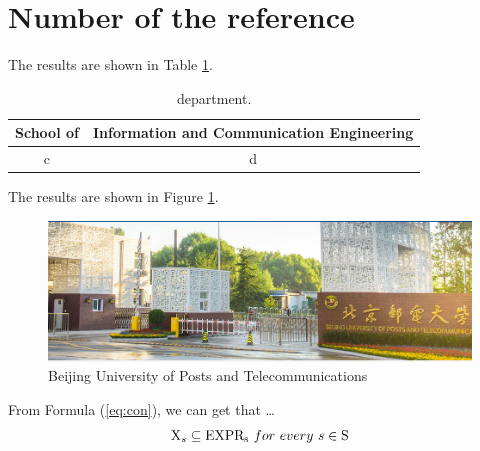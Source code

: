 \documentclass[]{article}
\begin{document}
\section{Number of the reference}
The results are shown in Table \ref{fig:de}.
\begin{table}[htbp]
	\caption{department.}\label{fig:de}\begin{tabular}{c|c} 
		\hline School of& Information and Communication Engineering	\\
		\hline c& d	\\ 		\hline 
\end{tabular}\end{table}	 
\par{}The results are shown in Figure \ref{fig:bup}.
\begin{figure}[ht]
	\caption{Beijing University of Posts and Telecommunications}\label{fig:bup}
	\includegraphics[width=13cm]{bupt.png}
\end{figure}
\par{}From Formula (\ref{eq:con}), we can get that \dots
\begin{equation}\label{eq:con}
{{\text{X}}_s} \subseteq {\rm E}{\text{X}}{\rm P}{{\text{R}}_{\text{s}}}{\text{  }}for{\text{ }}every{\text{ }}s \in {\text{S}}
\end{equation}
\end{document}
